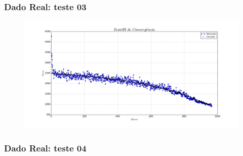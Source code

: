 \documentclass[aspectratio=10]{beamer} %
\begin{document}
\begin{frame}
	\frametitle{Dado Real: teste 03}
	\begin{figure}[H]
		\centering
		\includegraphics[scale=0.2]{Imagens/conv03.png}
		\label{Conv03}
	\end{figure} 
\end{frame}

\begin{frame}
	\frametitle{Dado Real: teste 04}
	\begin{figure}[H]
		\centering
		\qquad
		\qquad
		\qquad
		\label{SOMt04}
	\end{figure}
\end{frame}
\end{document}
